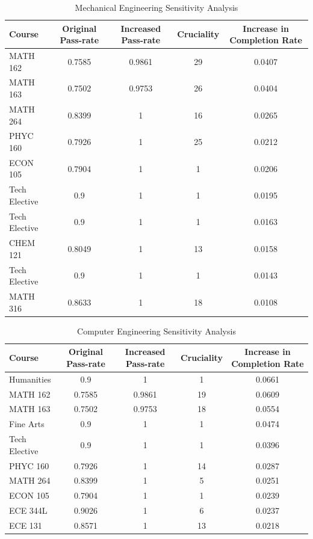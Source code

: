 \documentclass[botnum, fleqn]{unmeethesis}
\begin{document}
      \begin{table}[!h]
      \tiny
      \begin{tabular}{l*{4}{c}}
      Course & Original Pass-rate & Increased Pass-rate & Cruciality & Increase in Completion Rate \\
      \hline
      MATH 162 & 0.7585 & 0.9861 & 29 & 0.0407 \\
      MATH 163 & 0.7502 & 0.9753 & 26 & 0.0404 \\
      MATH 264 & 0.8399 & 1 & 16 & 0.0265 \\
      PHYC 160 & 0.7926 & 1 & 25 & 0.0212 \\
      ECON 105 & 0.7904 & 1 & 1 & 0.0206 \\
      Tech Elective & 0.9 & 1 & 1 & 0.0195 \\
      Tech Elective & 0.9 & 1 & 1 & 0.0163 \\
      CHEM 121 & 0.8049 & 1 & 13 & 0.0158 \\
      Tech Elective & 0.9 & 1 & 1 & 0.0143 \\
      MATH 316 & 0.8633 & 1 & 18 & 0.0108 \\
      \end{tabular}
      \caption{Mechanical Engineering Sensitivity Analysis}
      \label{tab:me_sensitivity}
      \end{table}

      \begin{table}[!h]
      \tiny
      \begin{tabular}{l*{4}{c}}
      Course & Original Pass-rate & Increased Pass-rate & Cruciality & Increase in Completion Rate \\
      \hline
      Humanities & 0.9 & 1 & 1 & 0.0661 \\
      MATH 162 & 0.7585 & 0.9861 & 19 & 0.0609 \\
      MATH 163 & 0.7502 & 0.9753 & 18 & 0.0554 \\
      Fine Arts & 0.9 & 1 & 1 & 0.0474 \\
      Tech Elective & 0.9 & 1 & 1 & 0.0396 \\
      PHYC 160 & 0.7926 & 1 & 14 & 0.0287 \\
      MATH 264 & 0.8399 & 1 & 5 & 0.0251 \\
      ECON 105 & 0.7904 & 1 & 1 & 0.0239 \\
      ECE 344L & 0.9026 & 1 & 6 & 0.0237 \\
      ECE 131 & 0.8571 & 1 & 13 & 0.0218 \\
      \end{tabular}
      \caption{Computer Engineering Sensitivity Analysis}
      \label{tab:cpe_sensitivity}
      \end{table}
\end{document}
